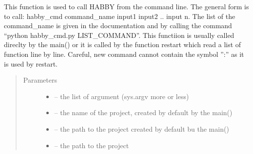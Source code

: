 \documentclass[letterpaper,10pt,english]{sphinxmanual}
\begin{document}
\begin{fulllineitems}
\label{\detokenize{index:habby_cmd.all_command}}
This function is used to call HABBY from the command line. The general form is to call:
habby\_cmd command\_name input1 input2 .. input n. The list of the command\_name is given in the documentation and by
calling the command ``python habby\_cmd.py LIST\_COMMAND''. This functiion is usually called direclty by the main()
or it is called by the function restart which read a list of function line by line. Careful, new command cannot
contain the symbol '':'' as it is used by restart.
\begin{quote}\begin{description}
\item[{Parameters}] \leavevmode\begin{itemize}
\item {} 
 -- the list of argument (sys.argv more or less)

\item {} 
 -- the name of the project, created by default by the main()

\item {} 
 -- the path to the project created by default bu the main()

\item {} 
 -- the path to the project

\end{itemize}

\end{description}\end{quote}

\end{fulllineitems}

\end{document}
